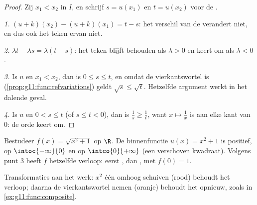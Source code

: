\begin{proof}
Zij $x_1 < x_2$ in $I$, en schrijf $s = u(x_1)$ en $t = u(x_2)$ voor de
.

\emph{1.} $(u+k)(x_2) - (u+k)(x_1) = t - s$: het verschil van de 
verandert niet, en dus ook het teken ervan niet.

\emph{2.} $\lambda t - \lambda s = \lambda(t - s)$: het teken blijft behouden
als $\lambda > 0$ en keert om als $\lambda < 0$.

\emph{3.} Is $u$  en $x_1 < x_2$, dan is $0 \leq s \leq t$, en omdat
de vierkantswortel  is (\cref{prop:g11:func:refvariations}) geldt
$\sqrt s \leq \sqrt t$. Hetzelfde argument werkt in het dalende geval.

\emph{4.} Is $u$  en $0 < s \leq t$ (of $s \leq t < 0$), dan is
$\frac1s \geq \frac1t$, want $x \mapsto \frac1x$ is  aan elke kant van
$0$: de orde keert om.
\end{proof}

\begin{example}\label{ex:g11:func:composite}
Bestudeer $f(x) = \sqrt{x^2 + 1}$ op $\R$. De binnenfunctie
$u(x) = x^2 + 1$ is positief,  op $\intoc{-\infty}{0}$ en  op
$\intco{0}{+\infty}$ (een verschoven kwadraat). Volgens punt 3 heeft $f$
hetzelfde verloop: eerst , dan , met  $f(0) = 1$.
\end{example}

\begin{omfigure}

{\small Transformaties aan het werk: $x^2$ één omhoog schuiven (rood) behoudt
het verloop; daarna de vierkantswortel nemen (oranje) behoudt het opnieuw,
zoals in \cref{ex:g11:func:composite}.}
\end{omfigure}

